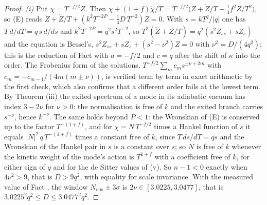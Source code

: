 \begin{proof}
\emph{(i)} Put $\chi = T^{-f/2}Z$. Then $\ddot\chi + (1 + f)\dot\chi/T = T^{-f/2}\bigl(\ddot Z + \dot Z/T - \tfrac14 f^{2}Z/T^{2}\bigr)$, so (E) reads $\ddot Z + \dot Z/T + (k^{2}T^{-2P} - \tfrac14 D\,T^{-2})Z = 0$. With $s = kT^{q}/|q|$ one has $T\,d/dT = q\,s\,d/ds$ and $k^{2}T^{-2P} = q^{2}s^{2}T^{-2}$, so $T^{2}(\ddot Z + \dot Z/T) = q^{2}(s^{2}Z_{ss} + sZ_{s})$ and the equation is Bessel's, $s^{2}Z_{ss} + sZ_{s} + (s^{2} - \nu^{2})Z = 0$ with $\nu^{2} = D/(4q^{2})$; this is the reduction of Fact  with $a = -f/2$ and $c = q$ after the shift of $\kappa$ into the order. The Frobenius form of the solutions, $T^{-f/2}\sum_{m}c_{m}s^{\pm\nu + 2m}$ with $c_{m} = -c_{m-1}/(4m(m \pm \nu))$, is verified term by term in exact arithmetic by the first check, which also confirms that a different order fails at the lowest term. By Theorem (iii) the exited spectrum of a mode in its adiabatic vacuum has index $3 - 2\nu$ for $\nu > 0$: the normalisation is free of $k$ and the exited branch carries $s^{-\nu}$, hence $k^{-\nu}$. The same holds beyond $P < 1$: the Wronskian of (E) is conserved up to the factor $T^{-(1 + f)}$, and for $\chi = N\,T^{-f/2}$ times a Hankel function of $s$ it equals $|N|^{2}\,q\,T^{-(1 + f)}$ times a constant free of $k$, since $T\,ds/dT = qs$ and the Wronskian of the Hankel pair in $s$ is a constant over $s$; so $N$ is free of $k$ whenever the kinetic weight of the mode's action is $T^{1 + f}$ with a coefficient free of $k$, for either sign of $q$ and for the de Sitter values of (v). So $n - 1 < 0$ exactly when $4\nu^{2} > 9$, that is $D > 9q^{2}$, with equality for scale invariance. With the measured value of Fact , the window $N_{\mathrm{obs}} \pm 3\sigma$ is $2\nu \in [3.0225, 3.0477]$, that is $3.0225^{2}q^{2} \le D \le 3.0477^{2}q^{2}$.


\end{proof}
